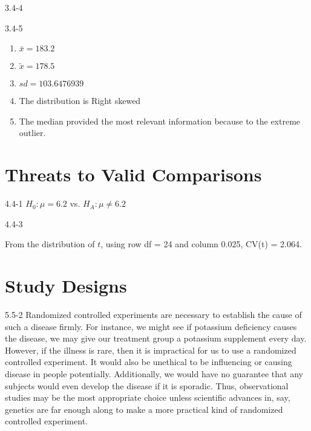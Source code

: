 \begin{exsol@solution}{3.4-4}


\end{exsol@solution}
\begin{exsol@solution}{3.4-5}

\begin{enumerate}
\item $\bar{x} = 183.2$
\item $\tilde{x} = 178.5$
\item $sd = 103.6476939 $
\item The distribution is Right skewed
\item The median provided the most relevant information because to the extreme outlier.
\end{enumerate}

\end{exsol@solution}
\setcounter{chapter}{4}\chapter{Threats to Valid Comparisons}
\begin{exsol@solution}{4.4-1}
	  $H_0: \mu = 6.2$ vs. $H_A: \mu \neq 6.2$
\end{exsol@solution}
\begin{exsol@solution}{4.4-3}

    From the distribution of $t$, using row df = 24 and column 0.025, CV(t) = 2.064.
\end{exsol@solution}
\setcounter{chapter}{5}\chapter{Study Designs}
\begin{exsol@solution}{5.5-2}
Randomized controlled experiments are necessary to establish the cause of such a disease firmly. For instance, we might see if potassium deficiency causes the disease, we may give our treatment group a potassium supplement every day. However, if the illness is rare, then it is impractical for us to use a randomized controlled experiment.  It would also be unethical to be influencing or causing disease in people potentially.  Additionally, we would have no guarantee that any subjects would even develop the disease if it is sporadic. Thus, observational studies may be the most appropriate choice unless scientific advances in, say, genetics are far enough along to make a more practical kind of randomized controlled experiment.
	
\end{exsol@solution}
